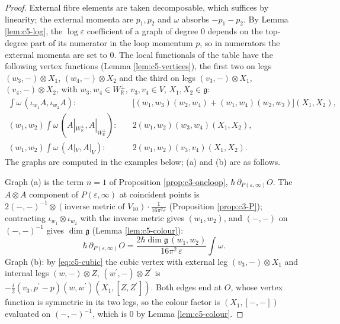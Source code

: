 \begin{proof}
External fibre elements are taken decomposable, which suffices by linearity; the external momenta are $p_1,p_2$ and $\omega$ absorbs $-p_1-p_2$. By Lemma \ref{lem:c5-log}, the $\log\varepsilon$ coefficient of a graph of degree $0$ depends on the top-degree part of its numerator in the loop momentum $p$, so in numerators the external momenta are set to $0$. The local functionals of the table have the following vertex functions (Lemma \ref{lem:c5-vertices}), the first two on legs $(w_3,-)\otimes X_1$, $(w_4,-)\otimes X_2$ and the third on legs $(v_3,-)\otimes X_1$, $(v_4,-)\otimes X_2$, with $w_3,w_4\in W_{\mathbb R}^\perp$, $v_3,v_4\in V$, $X_1,X_2\in\mathfrak g$:
\[
\begin{aligned}
\int\omega\,(\iota_{w_1}A,\iota_{w_2}A):&\quad\big[(w_1,w_3)(w_2,w_4)+(w_1,w_4)(w_2,w_3)\big](X_1,X_2),\\
(w_1,w_2)\int\omega\,(A|_{W_{\mathbb R}^\perp},A|_{W_{\mathbb R}^\perp}):&\quad 2(w_1,w_2)(w_3,w_4)(X_1,X_2),\\
(w_1,w_2)\int\omega\,(A|_V,A|_V):&\quad 2(w_1,w_2)(v_3,v_4)(X_1,X_2).
\end{aligned}
\] The graphs are computed in the examples below; (a) and (b) are as follows.

Graph (a) is the term $n=1$ of Proposition \ref{prop:c3-oneloop}, $\hbar\,\partial_{P(\varepsilon,\infty)}O$. The $A\otimes A$ component of $P(\varepsilon,\infty)$ at coincident points is $2(-,-)^{-1}\otimes(\text{inverse metric of }V_{10})\cdot\frac1{16\pi^2\varepsilon}$ (Proposition \ref{prop:c3-P}); contracting $\iota_{w_1}\otimes\iota_{w_2}$ with the inverse metric gives $(w_1,w_2)$, and $(-,-)$ on $(-,-)^{-1}$ gives $\dim\mathfrak g$ (Lemma \ref{lem:c5-colour}):
\[
\hbar\,\partial_{P(\varepsilon,\infty)}O=\frac{2\hbar\dim\mathfrak g\,(w_1,w_2)}{16\pi^2\,\varepsilon}\int\omega .
\]
Graph (b): by \eqref{eq:c5-cubic} the cubic vertex with external leg $(v_3,-)\otimes X_1$ and internal legs $(w,-)\otimes Z$, $(w^{\prime},-)\otimes Z^{\prime}$ is $-\frac i2(v_3,p^{\prime}-p)(w,w^{\prime})(X_1,[Z,Z^{\prime}])$. Both edges end at $O$, whose vertex function is symmetric in its two legs, so the colour factor is $(X_1,[-,-])$ evaluated on $(-,-)^{-1}$, which is $0$ by Lemma \ref{lem:c5-colour}.
\end{proof}

